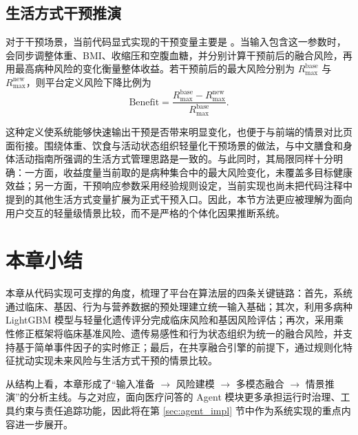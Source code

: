 \subsection{生活方式干预推演}

对于干预场景，当前代码显式实现的干预变量主要是 。当输入包含这一参数时， 会同步调整体重、BMI、收缩压和空腹血糖，并分别计算干预前后的融合风险，再用最高病种风险的变化衡量整体收益。若干预前后的最大风险分别为 \(R_{\max}^{\text{base}}\) 与 \(R_{\max}^{\text{new}}\)，则平台定义风险下降比例为
\begin{equation}
\text{Benefit} = \frac{R_{\max}^{\text{base}} - R_{\max}^{\text{new}}}{R_{\max}^{\text{base}}}.
\end{equation}

这种定义使系统能够快速输出干预是否带来明显变化，也便于与前端的情景对比页面衔接。围绕体重、饮食与活动状态组织轻量化干预场景的做法，与中文膳食和身体活动指南所强调的生活方式管理思路是一致的\cite{dietary2022cn,physicalactivity2021cn}。与此同时，其局限同样十分明确：一方面，收益度量当前取的是病种集合中的最大风险变化，未覆盖多目标健康效益；另一方面，干预响应参数采用经验规则设定，当前实现也尚未把代码注释中提到的其他生活方式变量扩展为正式干预入口。因此，本节方法更应被理解为面向用户交互的轻量级情景比较，而不是严格的个体化因果推断系统。

\section{本章小结}

本章从代码实现可支撑的角度，梳理了平台在算法层的四条关键链路：首先，系统通过临床、基因、行为与营养数据的预处理建立统一输入基础；其次，利用多病种 LightGBM 模型与轻量化遗传评分完成临床风险和基因风险评估；再次，采用乘性修正框架将临床基准风险、遗传易感性和行为状态组织为统一的融合风险，并支持基于简单事件因子的实时修正；最后，在共享融合引擎的前提下，通过规则化特征扰动实现未来风险与生活方式干预的情景比较。

从结构上看，本章形成了“输入准备 $\rightarrow$ 风险建模 $\rightarrow$ 多模态融合 $\rightarrow$ 情景推演”的分析主线。与之对应，面向医疗问答的 Agent 模块更多承担运行时治理、工具约束与责任追踪功能，因此将在第 \ref{sec:agent_impl} 节中作为系统实现的重点内容进一步展开。
